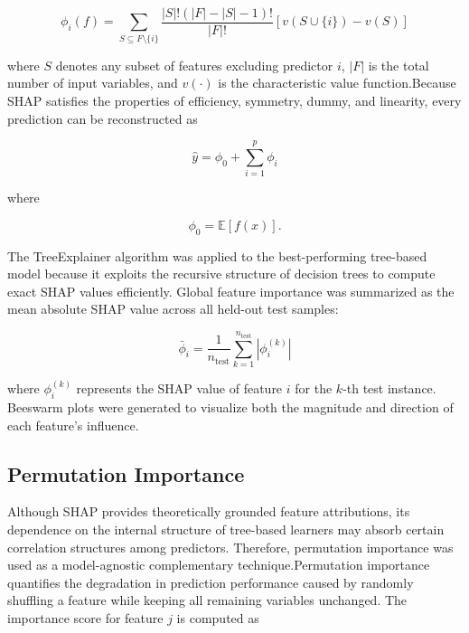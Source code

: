 \begin{equation}
\phi_i(f)=
\sum_{S\subseteq F\setminus\{i\}}
\frac{|S|!\left(|F|-|S|-1\right)!}{|F|!}
\left[
v(S\cup\{i\})-v(S)
\right]
\label{eq:shap}
\end{equation}

where $S$ denotes any subset of features excluding predictor $i$, $|F|$ is the total number of input variables, and $v(\cdot)$ is the characteristic value function.Because SHAP satisfies the properties of efficiency, symmetry, dummy, and linearity, every prediction can be reconstructed as

\begin{equation}
\hat{y}
=
\phi_0
+
\sum_{i=1}^{p}
\phi_i
\label{eq:prediction}
\end{equation}

where

\begin{equation}
\phi_0
=
\mathbb{E}[f(x)].
\label{eq:baseline}
\end{equation}

The TreeExplainer algorithm was applied to the best-performing tree-based model because it exploits the recursive structure of decision trees to compute exact SHAP values efficiently. Global feature importance was summarized as the mean absolute SHAP value across all held-out test samples:

\begin{equation}
\bar{\phi}_i
=
\frac{1}{n_{\mathrm{test}}}
\sum_{k=1}^{n_{\mathrm{test}}}
\left|
\phi_i^{(k)}
\right|
\label{eq:mean_shap}
\end{equation}

where $\phi_i^{(k)}$ represents the SHAP value of feature $i$ for the $k$-th test instance. Beeswarm plots were generated to visualize both the magnitude and direction of each feature's influence.



\subsection{Permutation Importance}

Although SHAP provides theoretically grounded feature attributions, its dependence on the internal structure of tree-based learners may absorb certain correlation structures among predictors. Therefore, permutation importance was used as a model-agnostic complementary technique.Permutation importance quantifies the degradation in prediction performance caused by randomly shuffling a feature while keeping all remaining variables unchanged. The importance score for feature $j$ is computed as

